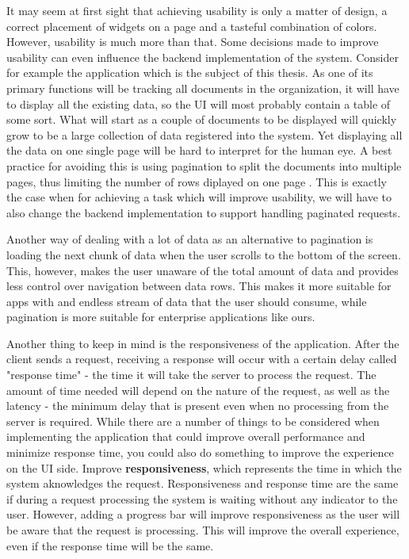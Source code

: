 It may seem at first sight that achieving usability is only a matter of design, a correct placement of widgets on a page and a tasteful combination of colors. However, usability is much more than that. Some decisions made to improve usability can even influence the backend implementation of the system. Consider for example the application which is the subject of this thesis. As one of its primary functions will be tracking all documents in the organization, it will have to display all the existing data, so the UI will most probably contain a table of some sort. What will start as a couple of documents to be displayed will quickly grow to be a large collection of data registered into the system. Yet displaying all the data on one single page will be hard to interpret for the human eye. A best practice for avoiding this is using pagination to split the documents into multiple pages, thus limiting the number of rows diplayed on one page \cite{modernEnterpriseUiDesign}. This is exactly the case when for achieving a task which will improve usability, we will have to also change the backend implementation to support handling paginated requests.

Another way of dealing with a lot of data as an alternative to pagination is loading the next chunk of data when the user scrolls to the bottom of the screen. This, however, makes the user unaware of the total amount of data and provides less control over navigation between data rows. This makes it more suitable for apps with and endless stream of data that the user should consume, while pagination is more suitable for enterprise applications like ours.

Another thing to keep in mind is the responsiveness of the application. After the client sends a request, receiving a response will occur with a certain delay called "response time" - the time it will take the server to process the request. The amount of time needed will depend on the nature of the request, as well as the latency - the minimum delay that is present even when no processing from the server is required. While there are a number of things to be considered when implementing the application that could improve overall performance and minimize response time, you could also do something to improve the experience on the UI side. Improve \textbf{responsiveness}, which represents the time in which the system aknowledges the request. Responsiveness and response time are the same if during a request processing the system is waiting without any indicator to the user. However, adding a progress bar will improve responsiveness as the user will be aware that the request is processing. This will improve the overall experience, even if the response time will be the same.







\cite{buildingRESTfulWebServicesWithSpring}
\cite{tamingTheStateInReact}
\cite{highPerformanceMySQL}
\cite{modernEnterpriseUiDesign}
